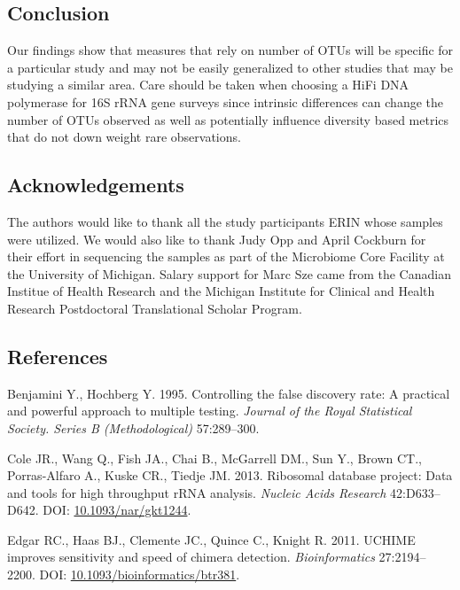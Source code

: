 \documentclass[12pt,]{article}
\begin{document}
\newpage

\subsection{Conclusion}\label{conclusion}

Our findings show that measures that rely on number of OTUs will be
specific for a particular study and may not be easily generalized to
other studies that may be studying a similar area. Care should be taken
when choosing a HiFi DNA polymerase for 16S rRNA gene surveys since
intrinsic differences can change the number of OTUs observed as well as
potentially influence diversity based metrics that do not down weight
rare observations.

\newpage

\subsection{Acknowledgements}\label{acknowledgements}

The authors would like to thank all the study participants ERIN whose
samples were utilized. We would also like to thank Judy Opp and April
Cockburn for their effort in sequencing the samples as part of the
Microbiome Core Facility at the University of Michigan. Salary support
for Marc Sze came from the Canadian Institue of Health Research and the
Michigan Institute for Clinical and Health Research Postdoctoral
Translational Scholar Program.

\newpage

\subsection{References}\label{references}

\hypertarget{refs}{}
\hypertarget{ref-benjamini_controlling_1995}{}
Benjamini Y., Hochberg Y. 1995. Controlling the false discovery rate: A
practical and powerful approach to multiple testing. \emph{Journal of
the Royal Statistical Society. Series B (Methodological)} 57:289--300.

\hypertarget{ref-rdp_Cole_2013}{}
Cole JR., Wang Q., Fish JA., Chai B., McGarrell DM., Sun Y., Brown CT.,
Porras-Alfaro A., Kuske CR., Tiedje JM. 2013. Ribosomal database
project: Data and tools for high throughput rRNA analysis. \emph{Nucleic
Acids Research} 42:D633--D642. DOI:
\href{https://doi.org/10.1093/nar/gkt1244}{10.1093/nar/gkt1244}.

\hypertarget{ref-uchime_Edgar_2011}{}
Edgar RC., Haas BJ., Clemente JC., Quince C., Knight R. 2011. UCHIME
improves sensitivity and speed of chimera detection.
\emph{Bioinformatics} 27:2194--2200. DOI:
\href{https://doi.org/10.1093/bioinformatics/btr381}{10.1093/bioinformatics/btr381}.
\end{document}
